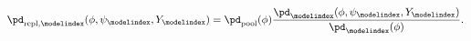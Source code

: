 \begin{equation}
  \pd_{\text{repl}, \modelindex}(\phi, \psi_{\modelindex}, Y_{\modelindex}) =
  \pd_{\text{pool}}(\phi)
  \frac{
    \pd_{\modelindex}(\phi, \psi_{\modelindex}, Y_{\modelindex})
  } {
    \pd_{\modelindex}(\phi)
  }.
  \label{eqn:marginal-replacement}
\end{equation}
